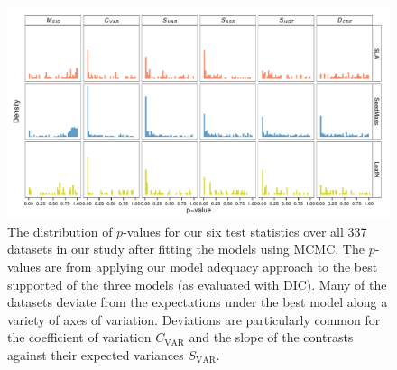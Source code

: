 \documentclass[12pt,twoside]{article}
\begin{document}
\begin{figure}[p]
  \centering
  \includegraphics[angle=90, origin=c, scale=0.75]{figs/pval-hist-bayes}
  \caption[Distribution of p-values for all 337 datasets (Bayesian)]{The distribution of $p$-values for our six test statistics over all 337 datasets in our study after fitting the models using MCMC. The $p$-values are from applying our model adequacy approach to the best supported of the three models (as evaluated with DIC). Many of the datasets deviate from the expectations under the best model along a variety of axes of variation. Deviations are particularly common for the coefficient of variation $C_{\text{VAR}}$ and the slope of the contrasts against their expected variances $S_{\text{VAR}}$.}
  \label{fig:supp-pvalues}
\end{figure}
\end{document}
